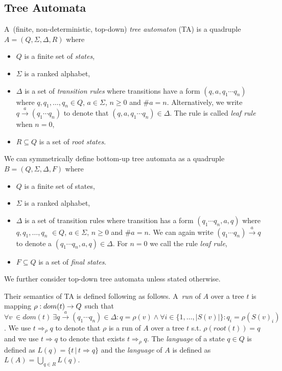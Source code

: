 \subsection{Tree Automata}
\label{subsec:ta}

A~(finite, non-deterministic, top-down) \emph{tree automaton} (TA) is a
quadruple $A = (Q, \Sigma, \Delta, R)$ where
\begin{itemize}
	\item $Q$ is a finite set of \emph{states},
	\item $\Sigma$ is a ranked alphabet,
	\item $\Delta$ is a set of \emph{transition rules} where transitions have a form $(q,a,q_1 \cdots q_n)$ where $q,q_1,\ldots,q_n \in Q$, $a \in \Sigma$, $n \geq 0$ and $\#a = n$.
		Alternatively, we write $q \xrightarrow{a} (q_1 \cdots q_n)$ to denote that $(q,a,q_1 \cdots q_n) \in \Delta$.
		The rule is called \emph{leaf rule} when $n=0$,
	\item $R \subseteq Q$ is a set of \emph{root states}.
\end{itemize}

We can symmetrically define bottom-up tree automata as a quadruple $B = (Q, \Sigma, \Delta, F)$ where
\begin{itemize}
	\item $Q$ is a finite set of states,
	\item $\Sigma$ is a ranked alphabet,
	\item $\Delta$ is a set of transition rules where transition has a form $(q_1 \cdots q_n,a,q)$ where \linebreak $q,$$q_1,\ldots,q_n$ $\in Q$, $a \in \Sigma$, $n \geq 0$ and $\#a = n$.
		We can again write $(q_1 \cdots q_n) \xrightarrow{a} q$ to denote a $(q_1 \cdots q_n,a,q) \in \Delta$.
		For $n=0$ we call the rule \emph{leaf rule},
	\item $F \subseteq Q$ is a set of \emph{final states}.
\end{itemize}

We further consider top-down tree automata unless stated otherwise.

Their semantics of TA is defined following as follows.
A~\emph{run} of $A$ over a tree $t$ is mapping $\rho: dom(t) \rightarrow Q$ such that
$\forall v~\in dom(t)\ \exists q \xrightarrow{a} (q_1 \cdots q_n) \in \Delta:  q=\rho(v) \wedge  \forall i \in \{1, \ldots, |S(v)|\}: q_i=\rho(S(v)_i)$.
We use $t \Rightarrow_{\rho} q$ to denote that $\rho$ is a run of $A$
over a tree $t$ s.t. $\rho(root(t)) = q$ and we use $t \Rightarrow q$ to denote that
exists $t \Rightarrow_{\rho} q$. %
The \emph{language} of a state $q\in Q$ is defined as $L(q) = \{t\,|\, t \Rightarrow q\}$
and the \emph{language} of $A$ is defined as $L(A) = \bigcup_{q\in R} L(q)$.

